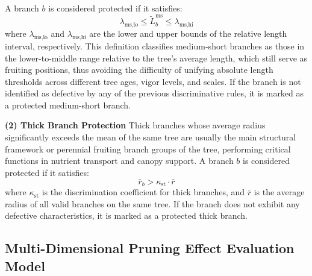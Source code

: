 \documentclass[12pt,a4paper,fontset=fandol]{ctexart}
\newcommand{\rb}{\bar{r}_b}
\begin{document}
A branch $b$ is considered protected if it satisfies:
\begin{equation}\label{eq:ms_protect}
  \lambda_{\text{ms,lo}} \leq \tilde{L}_b^{\text{ms}} \leq \lambda_{\text{ms,hi}}
\end{equation}
where $\lambda_{\text{ms,lo}}$ and $\lambda_{\text{ms,hi}}$ are the lower and upper bounds of the relative length interval, respectively.
This definition classifies medium-short branches as those in the lower-to-middle range relative to the tree's average length, which still serve as fruiting positions, thus avoiding the difficulty of unifying absolute length thresholds across different tree ages, vigor levels, and scales. If the branch is not identified as defective by any of the previous discriminative rules, it is marked as a protected medium-short branch.

\textbf{(2) Thick Branch Protection}
Thick branches whose average radius significantly exceeds the mean of the same tree are usually the main structural framework or perennial fruiting branch groups of the tree, performing critical functions in nutrient transport and canopy support. A branch $b$ is considered protected if it satisfies:
\begin{equation}\label{eq:sturdy_protect}
  \rb > \kappa_{\text{st}} \cdot \bar{r}
\end{equation}
where $\kappa_{\text{st}}$ is the discrimination coefficient for thick branches, and $\bar{r}$ is the average radius of all valid branches on the same tree. If the branch does not exhibit any defective characteristics, it is marked as a protected thick branch. 



\subsection{Multi-Dimensional Pruning Effect Evaluation Model}\label{sec:formalization:kpis}
\end{document}
